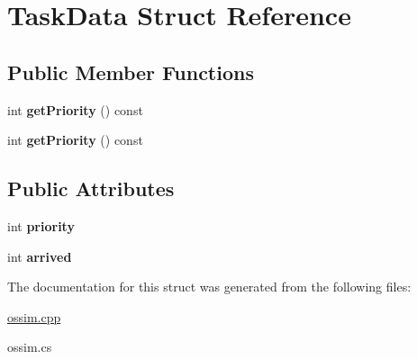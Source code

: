 \hypertarget{struct_task_data}{\section{Task\+Data Struct Reference}
\label{struct_task_data}
}
\subsection*{Public Member Functions}
\begin{DoxyCompactItemize}
\item 
\hypertarget{struct_task_data_a58cbe6eec8a86be7b827561a2f4b49c1}{int {\bfseries get\+Priority} () const }\label{struct_task_data_a58cbe6eec8a86be7b827561a2f4b49c1}

\item 
\hypertarget{struct_task_data_a58cbe6eec8a86be7b827561a2f4b49c1}{int {\bfseries get\+Priority} () const }\label{struct_task_data_a58cbe6eec8a86be7b827561a2f4b49c1}

\end{DoxyCompactItemize}
\subsection*{Public Attributes}
\begin{DoxyCompactItemize}
\item 
\hypertarget{struct_task_data_a9d8b606897eb428a62d816b71312e1b7}{int {\bfseries priority}}\label{struct_task_data_a9d8b606897eb428a62d816b71312e1b7}

\item 
\hypertarget{struct_task_data_a126fafee3369b6a2d8734f4e46c670bc}{int {\bfseries arrived}}\label{struct_task_data_a126fafee3369b6a2d8734f4e46c670bc}

\end{DoxyCompactItemize}


The documentation for this struct was generated from the following files\+:\begin{DoxyCompactItemize}
\item 
\hyperlink{ossim_8cpp}{ossim.\+cpp}\item 
ossim.\+cs\end{DoxyCompactItemize}
